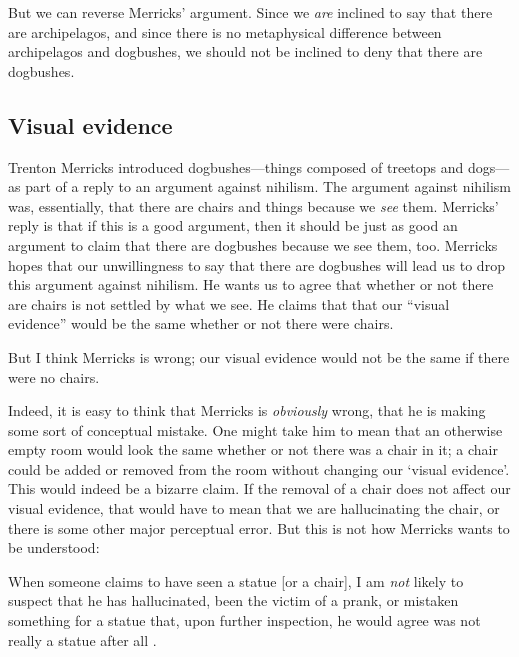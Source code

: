 \documentclass[11pt]{article}
\newenvironment{squote}{%
\begin{spacing}{1}
       	\begin{list}{}{%
\setlength{\labelwidth}{0pt}%
\rightmargin\leftmargin%
}
\item\relax
}{%
\end{list}%
\end{spacing}
}
\begin{document}
\begin{spacing}{1.25}
But we can reverse Merricks' argument.  Since we {\em are} inclined to
say that there are archipelagos, and since there is no metaphysical
difference between archipelagos and dogbushes, we should not be
inclined to deny that there are dogbushes.


\subsection{Visual evidence}
\label{visual}
Trenton Merricks introduced dogbushes---things composed of treetops
and dogs---as part of a reply to an argument against nihilism.  The
argument against nihilism was, essentially, that there are chairs and
things because we {\em see} them.  Merricks' reply is that if this is
a good argument, then it should be just as good an argument to claim
that there are dogbushes because we see them, too.  Merricks hopes
that our unwillingness to say that there are dogbushes will lead us
to drop this argument against nihilism.  He wants us to agree that
whether or not there are chairs is not settled by what we see.  He
claims that  that our ``visual evidence'' would be the same whether
or not there were chairs.

But I think Merricks is wrong; our visual evidence would not be the
same if there were no chairs.

Indeed, it is easy to think that Merricks is {\em obviously} wrong,
that he is making some sort of conceptual mistake.  One might take him
to mean that an otherwise empty room would look the same whether or
not there was a chair in it; a chair could be added or removed from
the room without changing our `visual evidence'.  This would indeed be
a bizarre claim.  If the removal of a chair does not affect our visual
evidence, that would have to mean that we are hallucinating the chair,
or there is some other major perceptual error.  But this is not how
Merricks wants to be understood:

\begin{squote}
When someone claims to have seen a statue [or a chair], I am {\em not}
likely to suspect that he has hallucinated, been the victim of a
prank, or mistaken something for a statue that, upon further
inspection, he would agree was not really a statue after all
\citeyearpar[2]{merricks2001a}.
\end{squote}


\end{spacing}
\end{document}
